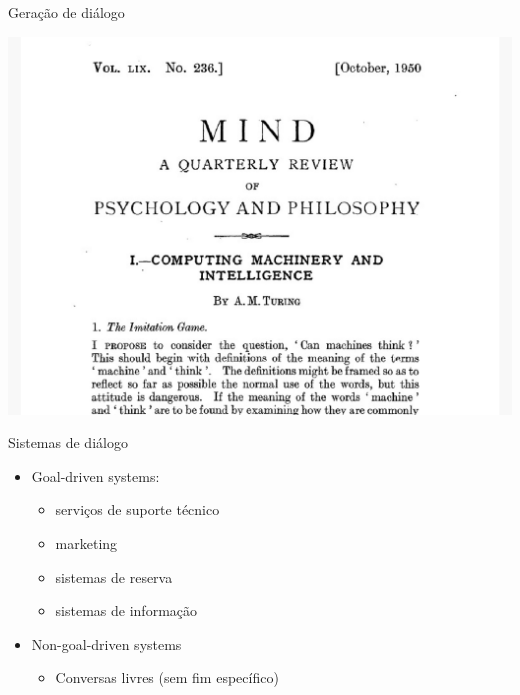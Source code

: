 \documentclass[10pt]{beamer}
\begin{document}
\maketitle


\begin{frame}{Geração de diálogo}
\begin{center}
\includegraphics[scale=0.16]{images/turing.jpg}
\end{center}
\end{frame}


\begin{frame}{Sistemas de diálogo}
\begin{itemize}
\item \alert{Goal-driven systems}:
\begin{itemize}
\item serviços de suporte técnico
\item marketing      
\item sistemas de reserva
\item sistemas de informação
\end{itemize}

\vspace{0.4cm}
\item \alert{Non-goal-driven systems}
\begin{itemize}
\item Conversas livres (sem fim específico)
\end{itemize}
\end{itemize}


\end{frame}
\end{document}
